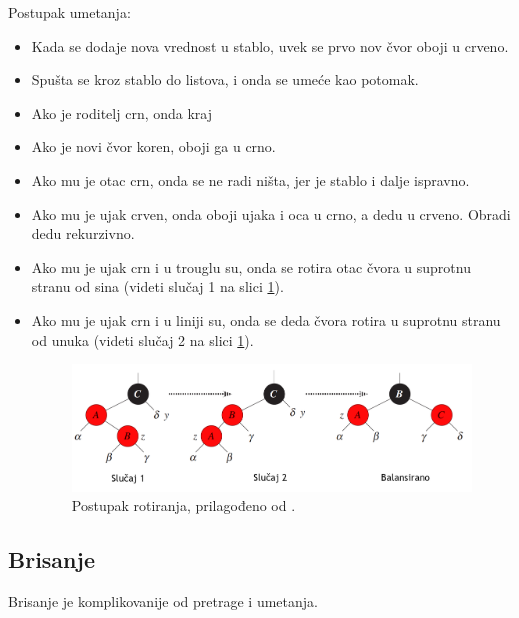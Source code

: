 \documentclass[a4paper]{article}
\begin{document}
    Postupak umetanja:
    \begin{itemize}

    \item Kada se dodaje nova vrednost u stablo, uvek se prvo nov čvor oboji u crveno.
    \item Spušta se kroz stablo do listova, i onda se umeće kao potomak.

    \item Ako je roditelj crn, onda kraj

   \item Ako je novi čvor koren, oboji ga u crno.
   \item Ako mu je otac crn, onda se ne radi ništa, jer je stablo i dalje ispravno.
   \item Ako mu je ujak crven, onda oboji ujaka i oca u crno, a dedu u crveno. Obradi dedu rekurzivno.
   \item Ako mu je ujak crn i u trouglu su, onda se rotira otac čvora u suprotnu stranu od sina (videti slučaj 1 na slici \ref{fig:rotation}).
   \item Ako mu je ujak crn i u liniji su, onda se deda čvora rotira u suprotnu stranu od unuka (videti slučaj 2 na slici \ref{fig:rotation}).

    \begin{figure}[h!]
        \begin{center}
        \includegraphics[scale=0.26]{rotation.png}
        \end{center}
        \caption{Postupak rotiranja, prilagođeno od \cite{clrs}.}
        \label{fig:rotation}
    \end{figure}

\end{itemize}




\subsection{Brisanje}
Brisanje je komplikovanije od pretrage i umetanja.
\end{document}

